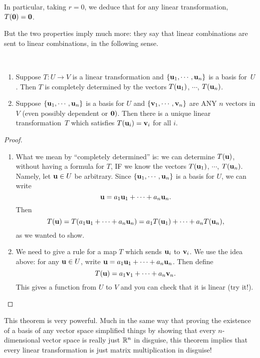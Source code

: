 In particular, taking $r=0$, we deduce that for any linear
transformation, $T(\mathbf{0}) = \mathbf{0}$.

But the two properties imply much more:  they say that linear
combinations are sent to linear combinations, in the following
sense.

\begin{theorem}\label{Thm:LTbasis} ~
\begin{enumerate}
\item Suppose $T \colon U \to V$ is a linear transformation and
$\{ \mathbf{u}_1, \cdots, \mathbf{u}_n\}$ is a basis for~$U$.  Then $T$
is completely determined by the vectors $T(\mathbf{u}_1)$, $\cdots$,
$T(\mathbf{u}_n)$.
\item Suppose  $\{ \mathbf{u}_1, \cdots, \mathbf{u}_n\}$ is a basis for $U$
and $\{ \mathbf{v}_1, \cdots, \mathbf{v}_n\}$ are ANY $n$ vectors in $V$ (even
possibly dependent or $\mathbf{0})$.  Then there is a unique linear
transformation~$T$ which satisfies $T(\mathbf{u}_i)=\mathbf{v}_i$ for all $i$.
\end{enumerate}
\end{theorem}

\begin{proof}
\begin{enumerate}
\item What we mean by ``completely determined'' is:  we can
determine $T(\mathbf{u})$, without having a formula for $T$, IF we
know the vectors $T(\mathbf{u}_1)$, $\cdots$,
$T(\mathbf{u}_n)$.  Namely, let $\mathbf{u} \in U$ be arbitrary.  Since
$\{ \mathbf{u}_1, \cdots, \mathbf{u}_n\}$ is a basis for $U$, we can
write
$$\mathbf{u} = a_1\mathbf{u}_1+\cdots+a_n\mathbf{u}_n.$$
Then
$$
T(\mathbf{u}) = T(a_1\mathbf{u}_1+\cdots+a_n\mathbf{u}_n) = a_1T(\mathbf{u}_1) + \cdots + a_nT(\mathbf{u}_n),
$$
as we wanted to show.
\item We need to give a rule for a map $T$ which sends $\mathbf{u}_i$ to $\mathbf{v}_i$.
We use the idea above:  for any $\mathbf{u} \in U$, write $\mathbf{u} = a_1\mathbf{u}_1+\cdots+a_n\mathbf{u}_n$.  Then define
$$
T(\mathbf{u}) = a_1\mathbf{v}_1 + \cdots + a_n\mathbf{v}_n.
$$
This gives a function from $U$ to $V$ and you can check that it
is linear (try it!).
\end{enumerate}
\end{proof}

This theorem is very powerful.  Much in the same way that proving
the existence of a basis of any vector space simplified things
by showing that every $n$-dimensional vector space is really
just $\mathbb{R}^n$ in disguise, this theorem implies that every
linear transformation is just matrix multiplication in disguise!


